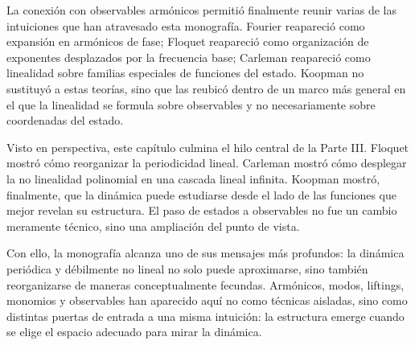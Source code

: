 La conexión con observables armónicos permitió finalmente reunir varias de las intuiciones que han atravesado esta monografía. Fourier reapareció como expansión en armónicos de fase; Floquet reapareció como organización de exponentes desplazados por la frecuencia base; Carleman reapareció como linealidad sobre familias especiales de funciones del estado. Koopman no sustituyó a estas teorías, sino que las reubicó dentro de un marco más general en el que la linealidad se formula sobre observables y no necesariamente sobre coordenadas del estado.

Visto en perspectiva, este capítulo culmina el hilo central de la Parte III. Floquet mostró cómo reorganizar la periodicidad lineal. Carleman mostró cómo desplegar la no linealidad polinomial en una cascada lineal infinita. Koopman mostró, finalmente, que la dinámica puede estudiarse desde el lado de las funciones que mejor revelan su estructura. El paso de estados a observables no fue un cambio meramente técnico, sino una ampliación del punto de vista.

Con ello, la monografía alcanza uno de sus mensajes más profundos: la dinámica periódica y débilmente no lineal no solo puede aproximarse, sino también reorganizarse de maneras conceptualmente fecundas. Armónicos, modos, liftings, monomios y observables han aparecido aquí no como técnicas aisladas, sino como distintas puertas de entrada a una misma intuición: la estructura emerge cuando se elige el espacio adecuado para mirar la dinámica.
